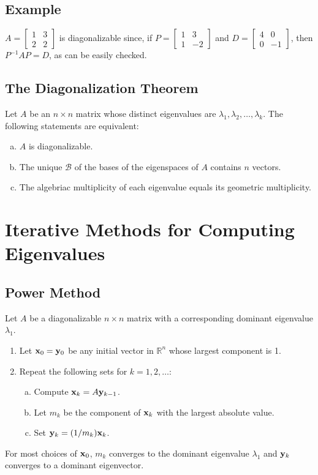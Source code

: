 \subsection*{Example}
$A=\begin{bmatrix}
        1 & 3 \\
        2 & 2
    \end{bmatrix}$ is diagonalizable since, if $P=\begin{bmatrix}
        1 & 3  \\
        1 & -2
    \end{bmatrix}$ and $D=\begin{bmatrix}
        4 & 0  \\
        0 & -1
    \end{bmatrix}$, then $P^{-1}AP=D$, as can be easily checked.

\subsection*{The Diagonalization Theorem}
Let $A$ be an $n\times n$ matrix whose distinct eigenvalues are $\lambda_1,\lambda_2,\dots,\lambda_k$.
The following statements are equivalent:
\begin{enumerate}[(a)]
    \item $A$ is diagonalizable.
    \item The unique $\mathcal{B}$ of the bases of the eigenspaces of $A$ contains $n$ vectors.
    \item The algebriac multiplicity of each eigenvalue equals its geometric multiplicity.
\end{enumerate}

\section{Iterative Methods for Computing Eigenvalues}

\subsection*{Power Method}
Let $A$ be a diagonalizable $n\times n$ matrix with a corresponding dominant eigenvalue $\lambda_1$.
\begin{enumerate}
    \item Let $\mathbf{x}_0=\mathbf{y}_0$ be any initial vector in $\mathbb{R}^n$ whose largest component is 1.
    \item Repeat the following sets for $k=1,2,\dots :$
          \begin{enumerate}[(a)]
              \item Compute $\mathbf{x}_k=A\mathbf{y}_{k-1}$.
              \item Let $m_k$ be the component of $\mathbf{x}_k$ with the largest absolute value.
              \item Set $\mathbf{y}_k=(1/m_k)\mathbf{x}_k$.
          \end{enumerate}
\end{enumerate}
For most choices of $\mathbf{x}_0$, $m_k$ converges to the dominant eigenvalue $\lambda_1$ and
$\mathbf{y}_k$ converges to a dominant eigenvector.

